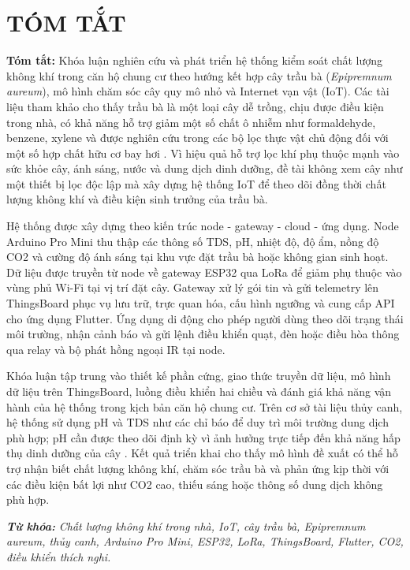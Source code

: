 \chapter*{TÓM TẮT}
\fontsize{13}{15}\selectfont

\textbf{Tóm tắt:} Khóa luận nghiên cứu và phát triển hệ thống kiểm soát chất lượng không khí trong căn hộ chung cư theo hướng kết hợp cây trầu bà (\textit{Epipremnum aureum}), mô hình chăm sóc cây quy mô nhỏ và Internet vạn vật (IoT). Các tài liệu tham khảo cho thấy trầu bà là một loại cây dễ trồng, chịu được điều kiện trong nhà, có khả năng hỗ trợ giảm một số chất ô nhiễm như formaldehyde, benzene, xylene và được nghiên cứu trong các bộ lọc thực vật chủ động đối với một số hợp chất hữu cơ bay hơi \cite{pothos_wisconsin,montaluisa_pothos_biofilter}. Vì hiệu quả hỗ trợ lọc khí phụ thuộc mạnh vào sức khỏe cây, ánh sáng, nước và dung dịch dinh dưỡng, đề tài không xem cây như một thiết bị lọc độc lập mà xây dựng hệ thống IoT để theo dõi đồng thời chất lượng không khí và điều kiện sinh trưởng của trầu bà.

Hệ thống được xây dựng theo kiến trúc node - gateway - cloud - ứng dụng. Node Arduino Pro Mini thu thập các thông số TDS, pH, nhiệt độ, độ ẩm, nồng độ CO2 và cường độ ánh sáng tại khu vực đặt trầu bà hoặc không gian sinh hoạt. Dữ liệu được truyền từ node về gateway ESP32 qua LoRa để giảm phụ thuộc vào vùng phủ Wi-Fi tại vị trí đặt cây. Gateway xử lý gói tin và gửi telemetry lên ThingsBoard phục vụ lưu trữ, trực quan hóa, cấu hình ngưỡng và cung cấp API cho ứng dụng Flutter. Ứng dụng di động cho phép người dùng theo dõi trạng thái môi trường, nhận cảnh báo và gửi lệnh điều khiển quạt, đèn hoặc điều hòa thông qua relay và bộ phát hồng ngoại IR tại node.

Khóa luận tập trung vào thiết kế phần cứng, giao thức truyền dữ liệu, mô hình dữ liệu trên ThingsBoard, luồng điều khiển hai chiều và đánh giá khả năng vận hành của hệ thống trong kịch bản căn hộ chung cư. Trên cơ sở tài liệu thủy canh, hệ thống sử dụng pH và TDS như các chỉ báo để duy trì môi trường dung dịch phù hợp; pH cần được theo dõi định kỳ vì ảnh hưởng trực tiếp đến khả năng hấp thụ dinh dưỡng của cây \cite{singh_hydroponics_ph_ec}. Kết quả triển khai cho thấy mô hình đề xuất có thể hỗ trợ nhận biết chất lượng không khí, chăm sóc trầu bà và phản ứng kịp thời với các điều kiện bất lợi như CO2 cao, thiếu sáng hoặc thông số dung dịch không phù hợp.

\textbf{\textit{Từ khóa: }} \textit{Chất lượng không khí trong nhà, IoT, cây trầu bà, Epipremnum aureum, thủy canh, Arduino Pro Mini, ESP32, LoRa, ThingsBoard, Flutter, CO2, điều khiển thích nghi.}
